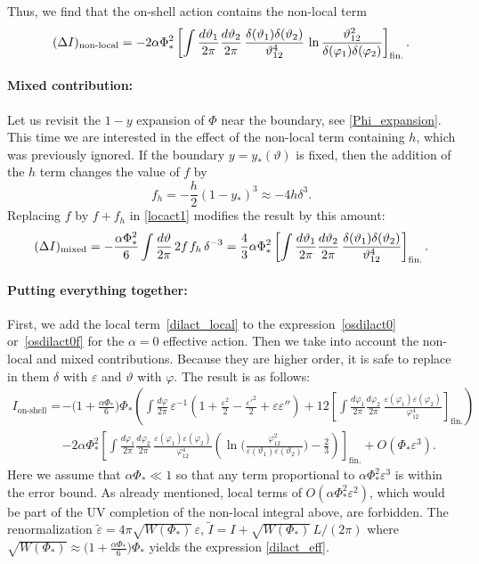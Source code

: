 \documentclass[12pt]{article}
\newcommand{\eps}{\varepsilon}
\newcommand{\nloc}{\text{non-local}}
\newcommand{\de}{\delta}
\newcommand{\vt}{\vartheta}
\newcommand{\vep}{\varepsilon}
\newcommand{\tvep}{\tilde{\varepsilon}}
\newcommand{\vp}{\varphi}
\newcommand{\ov}{\over}
\begin{document}
Thus, we find that the on-shell action contains the non-local term
\begin{equation}\label{dilact_nl}
(\Delta I)_{\nloc}
=-2\alpha \Phi_*^2\left[\int{d\vt_1 \ov 2 \pi}{d\vt_2 \ov 2 \pi}\,
\frac{\de(\vt_1)\de(\vt_2)}{\vt_{12}^4}\,
\ln\frac{\vt_{12}^2}{\de(\vp_1)\de(\vp_2)}\right]_{\text{fin.}}.
\end{equation}

\paragraph{Mixed contribution:} Let us revisit the $1-y$ expansion of $\Phi$ near the boundary, see \eqref{Phi_expansion}. This time we are interested in the effect of the non-local term containing $h$, which was previously ignored. If the boundary $y=y_*(\vt)$ is fixed, then the addition of the $h$ term changes the value of $f$ by
\begin{equation}
f_h=-\frac{h}{2}(1-y_*)^3\approx -4h\de^3.
\end{equation}
Replacing $f$ by $f+f_h$ in \eqref{locact1} modifies the result by this amount:
\begin{equation}\label{dilact_mixed}
(\Delta I)_{\text{mixed}}
=-\frac{\alpha\Phi_*^2}{6}\int\frac{d\vt}{2\pi}\,2f\kern1pt f_h\,\de^{-3}
=\frac{4}{3}\alpha\Phi_*^2\left[\int{d\vt_1 \ov 2 \pi}{d\vt_2 \ov 2 \pi}\,
\frac{\de(\vt_1)\de(\vt_2)}{\vt_{12}^4}\right]_{\text{fin.}}.
\end{equation}

\paragraph{Putting everything together:} First, we add the local term~\eqref{dilact_local} to the expression~\eqref{osdilact0} or~\eqref{osdilact0f} for the $\alpha=0$ effective action. Then we take into account the non-local and mixed contributions. Because they are higher order, it is safe to replace in them $\de$ with $\vep$ and $\vt$ with $\vp$. The result is as follows:
\begin{align}
I_{\text{on-shell}}
=&-\biggl(1+\frac{\alpha\Phi_*}{6}\biggr)\Phi_* \left(
\int \frac{d\vp}{2\pi}\,\vep^{-1}
\left(1+\frac{\vep^2}{2}-\frac{\vep'^2}{2}+\vep\vep''\right)
+12\left[\int\frac{d\vp_1}{2\pi}\frac{d\vp_2}{2\pi}\,
\frac{\vep(\vp_1)\vep(\vp_2)}{\vp_{12}^4}\right]_{\text{fin.}}\right)
\nonumber\\[3pt]
&-2\alpha \Phi_*^2\left[\int\frac{d\vp_1}{2\pi}\frac{d\vp_2}{2\pi}\,
\frac{\vep(\vp_1)\vep(\vp_2)}{\vp_{12}^4}
\left(\ln\biggl(\frac{\vp_{12}^2}{\vep(\vt_1)\vep(\vt_2)}\biggr)-\frac{2}{3}
\right)\right]_{\text{fin.}}+O(\Phi_*\vep^3).
\end{align}
Here we assume that $\alpha\Phi_*\ll 1$ so that any term proportional to $\alpha\Phi_*^2\vep^3$ is within the error bound. As already mentioned, local terms of $O(\alpha\Phi_*^2\eps^2)$, which would be part of the UV completion of the non-local integral above, are forbidden. The renormalization $\tvep=4\pi\sqrt{W(\Phi_*)}\,\vep$, $\tilde{I}=I+\sqrt{W(\Phi_*)}\,L/(2\pi)$ where $\sqrt{W(\Phi_*)}\approx\bigl(1+\frac{\alpha\Phi_*}{6}\bigr)\Phi_*$ yields the expression \eqref{dilact_eff}. 
\end{document}
